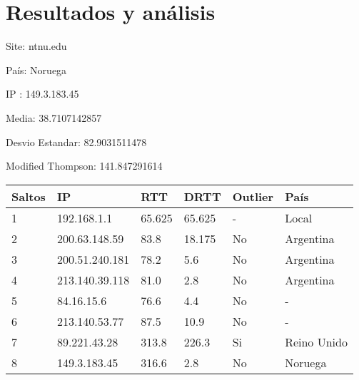 \section{Resultados y análisis}



Site: ntnu.edu

País: Noruega

IP : 149.3.183.45

Media: 38.7107142857 

Desvio Estandar: 82.9031511478 

Modified Thompson: 141.847291614

\begin{center}
    \begin{tabular}{| l | l | l | l | l | l | }
    \hline
    Saltos & IP             & RTT    & DRTT   & Outlier & País        \\ \hline
    1      & 192.168.1.1    & 65.625 & 65.625 & -       & Local       \\ \hline
    2      & 200.63.148.59  & 83.8   & 18.175 & No      & Argentina   \\ \hline
    3      & 200.51.240.181 & 78.2   & 5.6    & No      & Argentina   \\ \hline
    4      & 213.140.39.118 & 81.0   & 2.8    & No      & Argentina   \\ \hline
    5      & 84.16.15.6     & 76.6   & 4.4    & No      & -           \\ \hline
    6      & 213.140.53.77  & 87.5   & 10.9   & No      & -           \\ \hline
    7      & 89.221.43.28   & 313.8  & 226.3  & Si      & Reino Unido \\ \hline
    8      & 149.3.183.45   & 316.6  & 2.8    & No      & Noruega     \\ \hline
    \end{tabular}
\end{center}

